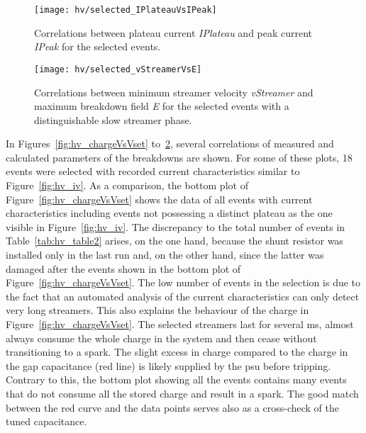 \begin{figure}[p]
	\centering
	\texttt{[image: hv/selected\_IPlateauVsIPeak]}
	\caption[ test plateau current versus peak current]{
		Correlations between plateau current \emph{IPlateau} and peak current \emph{IPeak} for the selected events.
		}
	\label{fig:hv_IPlateauVsIPeak}
\end{figure}

\begin{figure}[p]
	\centering
	\texttt{[image: hv/selected\_vStreamerVsE]}
	\caption[ test minimum streamer velocity versus maximum breakdown field]{
		Correlations between minimum streamer velocity \emph{vStreamer} and maximum breakdown field \emph{E} for the selected events with a distinguishable slow streamer phase.
	}
	\label{fig:hv_vStreamerVsE}
\end{figure}

In Figures~\ref{fig:hv_chargeVsVset} to~\ref{fig:hv_vStreamerVsE}, several correlations of measured and calculated parameters of the breakdowns are shown.
For some of these plots, \num{18} events were selected with recorded current characteristics similar to Figure~\ref{fig:hv_iv}.
As a comparison, the bottom plot of Figure~\ref{fig:hv_chargeVsVset} shows the data of all events with current characteristics including events not possessing a distinct plateau as the one visible in Figure~\ref{fig:hv_iv}.
The discrepancy to the total number of events in Table~\ref{tab:hv_table2} arises, on the one hand, because the shunt resistor was installed only in the last run and, on the other hand, since the latter was damaged after the events shown in the bottom plot of Figure~\ref{fig:hv_chargeVsVset}.
The low number of events in the selection is due to the fact that an automated analysis of the current characteristics can only detect very long streamers.
This also explains the behaviour of the charge in Figure~\ref{fig:hv_chargeVsVset}.
The selected streamers last for several \si{\milli\second}, almost always consume the whole charge in the system and then cease without transitioning to a spark.
The slight excess in charge compared to the charge in the gap capacitance (red line) is likely supplied by the \gls{psu} before tripping.
Contrary to this, the bottom plot showing all the events contains many events that do not consume all the stored charge and result in a spark.
The good match between the red curve and the data points serves also as a cross-check of the tuned capacitance.

